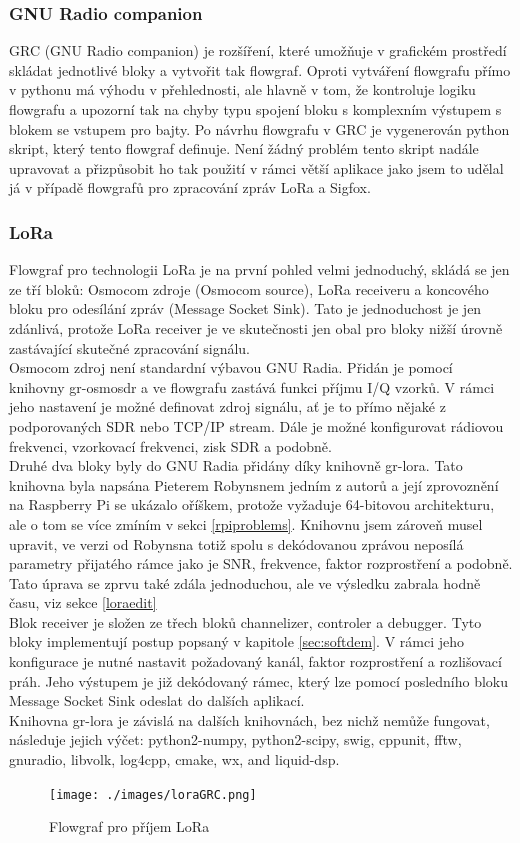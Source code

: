 \documentclass{ctuthesis}
\begin{document}
\subsubsection{GNU Radio companion}
GRC (GNU Radio companion) je rozšíření, které umožňuje v grafickém prostředí skládat jednotlivé bloky a vytvořit tak flowgraf. Oproti vytváření flowgrafu přímo v pythonu má výhodu v přehlednosti, ale hlavně v tom, že kontroluje logiku flowgrafu a upozorní tak na chyby typu spojení bloku s komplexním výstupem s blokem se vstupem pro bajty. Po návrhu flowgrafu v GRC je vygenerován python skript, který tento flowgraf definuje. Není žádný problém tento skript nadále upravovat a přizpůsobit ho tak použití v rámci větší aplikace jako jsem to udělal já v případě flowgrafů pro zpracování zpráv LoRa a Sigfox.

\subsubsection{LoRa}
Flowgraf pro technologii LoRa je na první pohled velmi jednoduchý, skládá se jen ze tří bloků: Osmocom zdroje (Osmocom source), LoRa receiveru a koncového bloku pro odesílání zpráv (Message Socket Sink). Tato je jednoduchost je jen zdánlivá, protože LoRa receiver je ve skutečnosti jen obal pro bloky nižší úrovně zastávající skutečné zpracování signálu. \\
Osmocom zdroj není standardní výbavou GNU Radia. Přidán je pomocí knihovny gr-osmosdr a ve flowgrafu zastává funkci příjmu I/Q vzorků. V rámci jeho nastavení je možné definovat zdroj signálu, ať je to přímo nějaké z podporovaných SDR nebo TCP/IP stream. Dále je možné konfigurovat rádiovou frekvenci, vzorkovací frekvenci, zisk SDR a podobně. \\
Druhé dva bloky byly do GNU Radia přidány díky knihovně gr-lora\cite{pieterrobynson}. Tato knihovna byla napsána Pieterem Robynsnem jedním z autorů \cite{gr-lora2018} a její zprovoznění na Raspberry Pi se ukázalo oříškem, protože vyžaduje 64-bitovou architekturu, ale o tom se více zmíním v sekci \ref{rpiproblems}. Knihovnu jsem zároveň musel upravit, ve verzi od Robynsna totiž spolu s dekódovanou zprávou neposílá parametry přijatého rámce jako je SNR, frekvence, faktor rozprostření a podobně. Tato úprava se zprvu také zdála jednoduchou, ale ve výsledku zabrala hodně času, viz sekce \ref{loraedit}\\
Blok receiver je složen ze třech bloků channelizer, controler a debugger. Tyto bloky implementují postup popsaný v kapitole \ref{sec:softdem}. V rámci jeho konfigurace je nutné nastavit požadovaný kanál, faktor rozprostření a rozlišovací práh. Jeho výstupem je již dekódovaný rámec, který lze pomocí posledního bloku Message Socket Sink odeslat do dalších aplikací.\\
Knihovna gr-lora je závislá na dalších knihovnách, bez nichž nemůže fungovat, následuje jejich výčet: python2-numpy, python2-scipy, swig, cppunit, fftw, gnuradio, libvolk, log4cpp, cmake, wx, and liquid-dsp. \cite{pieterrobynson}
\begin{figure}
\caption{Flowgraf pro příjem LoRa}
\texttt{[image: ./images/loraGRC.png]}
\label{loraGRC}
\end{figure}
\end{document}
